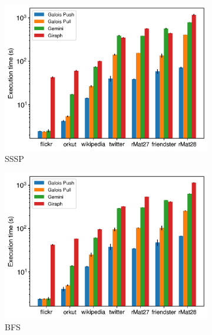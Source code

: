 \documentclass{meetings}
\begin{document}
\begin{figure}[h]
	\begin{subfigure}{0.32\textwidth}
		\includegraphics[width=\linewidth]{../../plots/distributedSSSP_execTime.png}
		\caption{SSSP}
		\label{fig:distributedSSSP_exec}
	\end{subfigure}
	\begin{subfigure}{0.32\textwidth}
		\includegraphics[width=\linewidth]{../../plots/distributedBFS_execTime.png}
		\caption{BFS}
		\label{fig:distributedSSSP_exec}
	\end{subfigure}
	\begin{subfigure}{0.32\textwidth}

\end{subfigure}
\end{figure}
\end{document}
